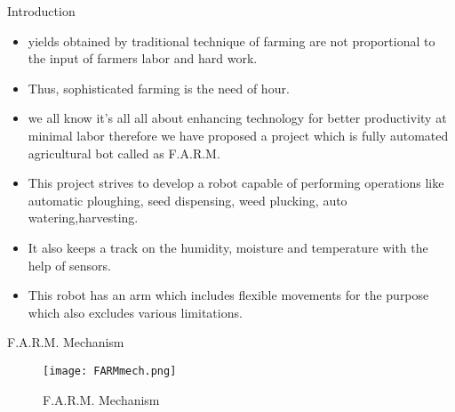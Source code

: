 \documentclass[10pt]{beamer}
\begin{document}
\begin{frame}[t]{ Introduction }\label{s2}
\begin{itemize}
\item{ yields obtained by traditional technique of farming are not proportional to the input of farmers labor and hard work. }
\item{Thus, sophisticated farming is the need of hour. }
\item{ we all know it's all all about enhancing technology for better productivity at minimal labor therefore we have proposed a project which is fully automated agricultural bot called as \alert{F.A.R.M.}}
\item{ This project strives to develop a robot capable of performing operations like automatic ploughing, seed dispensing, weed plucking, auto watering,harvesting.}
\item{It also keeps a track on the humidity, moisture and temperature with the help of sensors.}
\item{This robot has an arm which includes flexible movements for the purpose which also excludes various limitations.
	}

\end{itemize}
\end{frame}
\begin{frame}[t]{ F.A.R.M. Mechanism}
	\begin{figure}
		\texttt{[image: FARMmech.png]}
		\caption{F.A.R.M. Mechanism}
	
	\end{figure}  
\end{frame}
\end{document}
